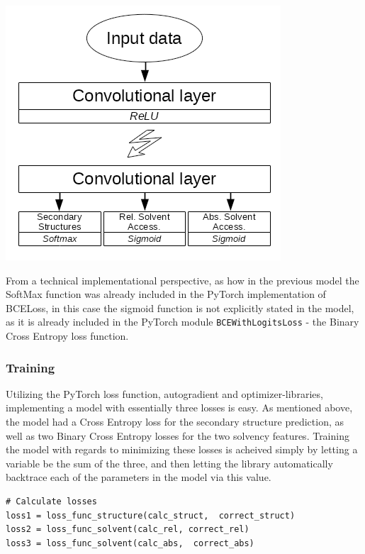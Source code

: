 \begin{multicols}{2}
\begin{Figure}
 \centering
 \includegraphics[width=\linewidth]{../graphs/arch}
 \captionsetup{width=0.8\linewidth, font=small}
\end{Figure}

\noindent From a technical implementational perspective, as how in the previous model the SoftMax function was already included in the PyTorch implementation of BCELoss, in this case the sigmoid function is not explicitly stated in the model, as it is already included in the PyTorch module \texttt{BCEWithLogitsLoss} - the Binary Cross Entropy loss function.

\subsubsection{Training}
Utilizing the PyTorch loss function, autogradient and optimizer-libraries, implementing a model with essentially three losses is easy. As mentioned above, the model had a Cross Entropy loss for the secondary structure prediction, as well as two Binary Cross Entropy losses for the two solvency features. Training the model with regards to minimizing these losses is acheived simply by letting a variable be the sum of the three, and then letting the library automatically backtrace each of the parameters in the model via this value.
\begin{lstlisting}
# Calculate losses
loss1 = loss_func_structure(calc_struct,  correct_struct)
loss2 = loss_func_solvent(calc_rel, correct_rel)
loss3 = loss_func_solvent(calc_abs,  correct_abs)


\end{lstlisting}
\end{multicols}
